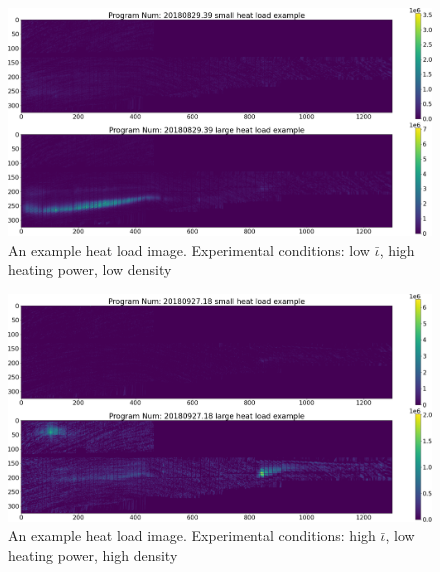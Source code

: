 \begin{figure}[htb]
	\includegraphics[width=\textwidth]{images/heat_load1.png}
	\caption{An example heat load image. Experimental conditions: low $\bar{\iota}$, high heating power, low density}
	\label{fig:data:heat_load1}
\end{figure}

\begin{figure}[htb]
	\includegraphics[width=\textwidth]{images/heat_load2.png}
	\caption{An example heat load image. Experimental conditions: high $\bar{\iota}$, low heating power, high density}
	\label{fig:data:heat_load2}
\end{figure}

